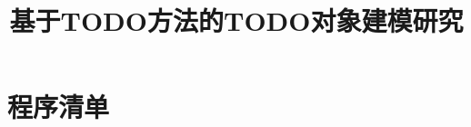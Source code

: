 \documentclass[UTF8,a4paper,12pt]{ctexart}
\title{基于TODO方法的TODO对象建模研究}
\author{}
\date{}
\begin{document}
\maketitle













\nocite{contest-rules-placeholder}



\appendix
\section{程序清单}

\end{document}
